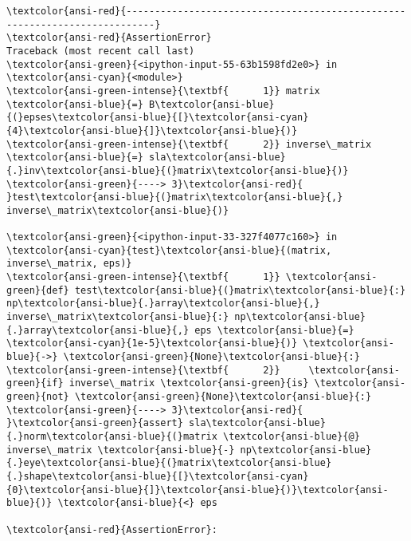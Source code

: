 \documentclass[11pt]{article}
\begin{document}
    \begin{Verbatim}[commandchars=\\\{\}, frame=single, framerule=2mm, rulecolor=\color{outerrorbackground}]
\textcolor{ansi-red}{---------------------------------------------------------------------------}
\textcolor{ansi-red}{AssertionError}                            Traceback (most recent call last)
\textcolor{ansi-green}{<ipython-input-55-63b1598fd2e0>} in \textcolor{ansi-cyan}{<module>}
\textcolor{ansi-green-intense}{\textbf{      1}} matrix \textcolor{ansi-blue}{=} B\textcolor{ansi-blue}{(}epses\textcolor{ansi-blue}{[}\textcolor{ansi-cyan}{4}\textcolor{ansi-blue}{]}\textcolor{ansi-blue}{)}
\textcolor{ansi-green-intense}{\textbf{      2}} inverse\_matrix \textcolor{ansi-blue}{=} sla\textcolor{ansi-blue}{.}inv\textcolor{ansi-blue}{(}matrix\textcolor{ansi-blue}{)}
\textcolor{ansi-green}{----> 3}\textcolor{ansi-red}{ }test\textcolor{ansi-blue}{(}matrix\textcolor{ansi-blue}{,} inverse\_matrix\textcolor{ansi-blue}{)}

\textcolor{ansi-green}{<ipython-input-33-327f4077c160>} in \textcolor{ansi-cyan}{test}\textcolor{ansi-blue}{(matrix, inverse\_matrix, eps)}
\textcolor{ansi-green-intense}{\textbf{      1}} \textcolor{ansi-green}{def} test\textcolor{ansi-blue}{(}matrix\textcolor{ansi-blue}{:} np\textcolor{ansi-blue}{.}array\textcolor{ansi-blue}{,} inverse\_matrix\textcolor{ansi-blue}{:} np\textcolor{ansi-blue}{.}array\textcolor{ansi-blue}{,} eps \textcolor{ansi-blue}{=} \textcolor{ansi-cyan}{1e-5}\textcolor{ansi-blue}{)} \textcolor{ansi-blue}{->} \textcolor{ansi-green}{None}\textcolor{ansi-blue}{:}
\textcolor{ansi-green-intense}{\textbf{      2}}     \textcolor{ansi-green}{if} inverse\_matrix \textcolor{ansi-green}{is} \textcolor{ansi-green}{not} \textcolor{ansi-green}{None}\textcolor{ansi-blue}{:}
\textcolor{ansi-green}{----> 3}\textcolor{ansi-red}{         }\textcolor{ansi-green}{assert} sla\textcolor{ansi-blue}{.}norm\textcolor{ansi-blue}{(}matrix \textcolor{ansi-blue}{@} inverse\_matrix \textcolor{ansi-blue}{-} np\textcolor{ansi-blue}{.}eye\textcolor{ansi-blue}{(}matrix\textcolor{ansi-blue}{.}shape\textcolor{ansi-blue}{[}\textcolor{ansi-cyan}{0}\textcolor{ansi-blue}{]}\textcolor{ansi-blue}{)}\textcolor{ansi-blue}{)} \textcolor{ansi-blue}{<} eps

\textcolor{ansi-red}{AssertionError}: 
    \end{Verbatim}
\end{document}
